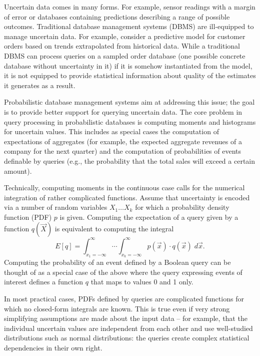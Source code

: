 

Uncertain data comes in many  forms.  For example, sensor readings with
a  margin  of  error
or  databases containing  predictions describing  a range  of possible
outcomes.    Traditional  database   management  systems   (DBMS)  are
ill-equipped  to manage  uncertain data.
For  example, consider  a predictive model  for customer
orders based  on trends extrapolated  from historical data.   While a
traditional  DBMS can process  queries on  a sampled  order data\-base
(one possible  concrete database without  uncertainty in it) if  it is
somehow instantiated  from the  model, it is  not equipped  to provide
statistical information about quality of the estimates it generates as
a result.


Probabilistic  database  management  systems \cite{dalvi07efficient,
WidomTrio2008, KochMayBMS2008, SD2007, ORION, MCDB, BayesStore}
aim at  addressing  this
issue; the  goal is to  provide better support for  querying uncertain
data.  The core problem in query
processing in probabilistic databases is computing
moments and histograms for uncertain values. This includes as special cases
the computation of expectations of aggregates (for example,
the expected aggregate revenues of a company for the next quarter) and
the computation of probabilities of events definable by queries (e.g.,
the probability that the total sales will exceed a certain amount).

Technically, computing moments 
in the  continuous case calls for the numerical integration of
rather complicated
functions. Assume that uncertainty is encoded via a number of random variables
$X_1 \dots X_k$ for which a probability density function (PDF) $p$ is given.
Computing the expectation of a query given by a function $q(\vec{X})$
is equivalent to computing the integral
%
\begin{equation}
\label{eq:expectation}
E[q] = \int_{x_1=-\infty}^\infty \cdots \int_{x_k=-\infty}^\infty
    p(\vec{x}) \cdot q(\vec{x}) \; d\vec{x}.
\end{equation}
%
Computing the probability of an event defined by a Boolean query can be
thought of as a special case of the above where the query expressing
events of interest defines a function $q$ that maps to
values 0 and 1 only.

In  most practical  cases,  PDFs defined  by  queries are  complicated
functions for which no closed-form  integrals are known.  This is true
even if very  strong simplifying assumptions are made  about the input
data  --  for  example,  that  the  individual  uncertain  values  are
independent from each other and use well-studied distributions such as
normal   distributions:   the   queries  create   complex
statistical dependencies in their own right.

